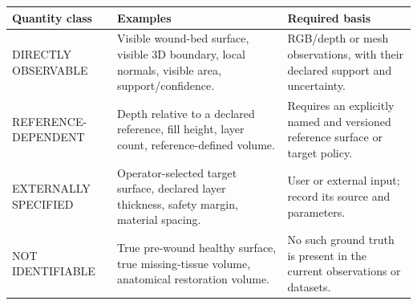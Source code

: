 \begin{tabularx}{\linewidth}{l X X}
\toprule
Quantity class & Examples & Required basis \\
\midrule
DIRECTLY OBSERVABLE & Visible wound-bed surface, visible 3D boundary, local normals, visible area, support/confidence. & RGB/depth or mesh observations, with their declared support and uncertainty. \\
REFERENCE-DEPENDENT & Depth relative to a declared reference, fill height, layer count, reference-defined volume. & Requires an explicitly named and versioned reference surface or target policy. \\
EXTERNALLY SPECIFIED & Operator-selected target surface, declared layer thickness, safety margin, material spacing. & User or external input; record its source and parameters. \\
NOT IDENTIFIABLE & True pre-wound healthy surface, true missing-tissue volume, anatomical restoration volume. & No such ground truth is present in the current observations or datasets. \\
\bottomrule
\end{tabularx}
